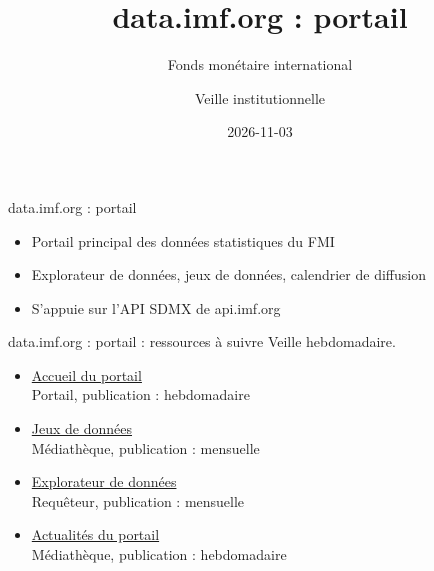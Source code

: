 \documentclass[aspectratio=169,11pt]{beamer}
\title{data.imf.org : portail}
\subtitle{Fonds monétaire international}
\author{Veille institutionnelle}
\date{2026-11-03}
\begin{document}
\begin{frame}\titlepage\end{frame}

\begin{frame}{data.imf.org : portail}
\begin{itemize}
\item Portail principal des données statistiques du FMI
\item Explorateur de données, jeux de données, calendrier de diffusion
\item S'appuie sur l'API SDMX de api.imf.org
\end{itemize}
\end{frame}

\begin{frame}{data.imf.org : portail : ressources à suivre}
\small
Veille hebdomadaire.
\begin{itemize}
\item \href{https://data.imf.org}{Accueil du portail}\\{\footnotesize Portail, publication : hebdomadaire}
\item \href{https://data.imf.org/en/Datasets}{Jeux de données}\\{\footnotesize Médiathèque, publication : mensuelle}
\item \href{https://data.imf.org/en/Data-Explorer}{Explorateur de données}\\{\footnotesize Requêteur, publication : mensuelle}
\item \href{https://data.imf.org/en/news}{Actualités du portail}\\{\footnotesize Médiathèque, publication : hebdomadaire}
\end{itemize}
\end{frame}
\end{document}
